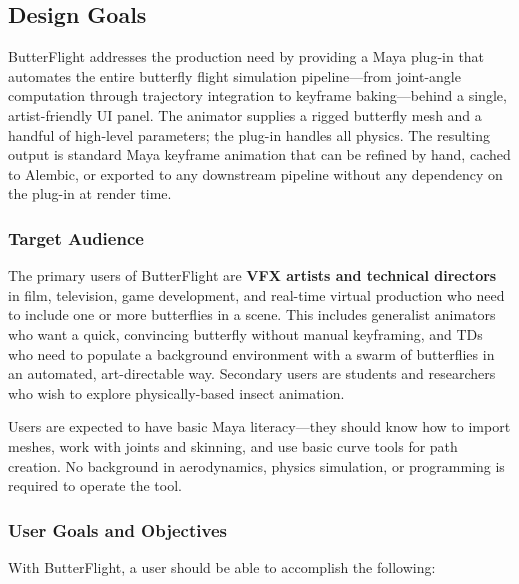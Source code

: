 \documentclass[12pt]{article}
\begin{document}
\subsection{Design Goals}

ButterFlight addresses the production need by providing a Maya plug-in that
automates the entire butterfly flight simulation pipeline---from joint-angle
computation through trajectory integration to keyframe baking---behind a
single, artist-friendly UI panel. The animator supplies a rigged butterfly
mesh and a handful of high-level parameters; the plug-in handles all
physics. The resulting output is standard Maya keyframe animation that can be
refined by hand, cached to Alembic, or exported to any downstream pipeline
without any dependency on the plug-in at render time.

\subsubsection{Target Audience}

The primary users of ButterFlight are \textbf{VFX artists and technical directors}
in film, television, game development, and real-time virtual production who need
to include one or more butterflies in a scene. This includes generalist
animators who want a quick, convincing butterfly without manual keyframing, and
TDs who need to populate a background environment with a swarm of butterflies in
an automated, art-directable way. Secondary users are students and researchers
who wish to explore physically-based insect animation.

Users are expected to have basic Maya literacy---they should know how to import
meshes, work with joints and skinning, and use basic curve tools for path
creation. No background in aerodynamics, physics simulation, or programming is
required to operate the tool.

\subsubsection{User Goals and Objectives}

With ButterFlight, a user should be able to accomplish the following:
\end{document}
